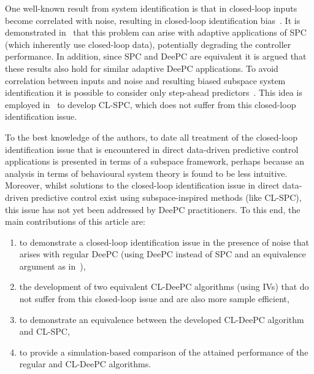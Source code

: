 One well-known result from system identification is that in closed-loop inputs become correlated with noise, resulting in closed-loop identification bias~\cite{Soderstrom1989a}. It is demonstrated in~\cite{Dinkla2023} that this problem can arise with adaptive applications of \ac{SPC} (which inherently use closed-loop data), potentially degrading the controller performance. In addition, since \ac{SPC} and \ac{DeePC} are equivalent it is argued that these results also hold for similar adaptive \ac{DeePC} applications. To avoid correlation between inputs and noise and resulting biased subspace system identification it is possible to consider only step-ahead predictors~\cite{Ljung1996}. This idea is employed in~\cite{Dong2008} to develop \ac{CL-SPC}, which does not suffer from this closed-loop identification issue.

To the best knowledge of the authors, to date all treatment of the closed-loop identification issue that is encountered in direct data-driven predictive control applications is presented in terms of a subspace framework, perhaps because an analysis in terms of behavioural system theory is found to be less intuitive. Moreover, whilst solutions to the closed-loop identification issue in direct data-driven predictive control exist using subspace-inspired methods (like \ac{CL-SPC}), this issue has not yet been addressed by \ac{DeePC} practitioners. To this end, the main contributions of this article are:
\begin{enumerate}
\item to demonstrate a closed-loop identification issue in the presence of noise that arises with regular \ac{DeePC} (using \ac{DeePC} instead of \ac{SPC} and an equivalence argument as in~\cite{Dinkla2023}),
\item the development of two equivalent \ac{CL-DeePC} algorithms (using \ac{IVs}) that do not suffer from this closed-loop issue and are also more sample efficient,
\item to demonstrate an equivalence between the developed \ac{CL-DeePC} algorithm and \ac{CL-SPC},
\item to provide a simulation-based comparison of the attained performance of the regular and \ac{CL-DeePC} algorithms.
\end{enumerate}